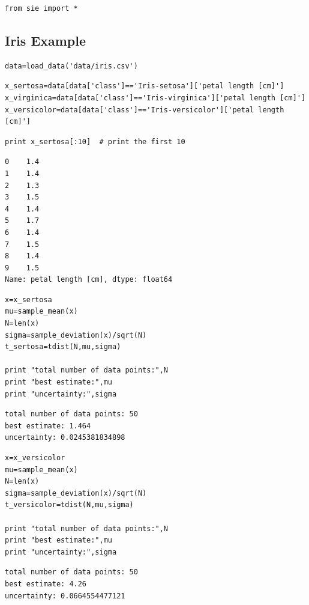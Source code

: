 \begin{lstlisting}
from sie import *
\end{lstlisting}

\subsection{Iris Example}


\begin{lstlisting}
data=load_data('data/iris.csv')
\end{lstlisting}

\begin{lstlisting}
x_sertosa=data[data['class']=='Iris-setosa']['petal length [cm]']
x_virginica=data[data['class']=='Iris-virginica']['petal length [cm]']
x_versicolor=data[data['class']=='Iris-versicolor']['petal length [cm]']
\end{lstlisting}

\begin{lstlisting}
print x_sertosa[:10]  # print the first 10
\end{lstlisting}

\begin{verbatim}
0    1.4
1    1.4
2    1.3
3    1.5
4    1.4
5    1.7
6    1.4
7    1.5
8    1.4
9    1.5
Name: petal length [cm], dtype: float64
\end{verbatim}

\begin{lstlisting}
x=x_sertosa
mu=sample_mean(x)
N=len(x)
sigma=sample_deviation(x)/sqrt(N)
t_sertosa=tdist(N,mu,sigma)

print "total number of data points:",N
print "best estimate:",mu
print "uncertainty:",sigma
\end{lstlisting}

\begin{verbatim}
total number of data points: 50
best estimate: 1.464
uncertainty: 0.0245381834898
\end{verbatim}

\begin{lstlisting}
x=x_versicolor
mu=sample_mean(x)
N=len(x)
sigma=sample_deviation(x)/sqrt(N)
t_versicolor=tdist(N,mu,sigma)

print "total number of data points:",N
print "best estimate:",mu
print "uncertainty:",sigma
\end{lstlisting}

\begin{verbatim}
total number of data points: 50
best estimate: 4.26
uncertainty: 0.0664554477121
\end{verbatim}

